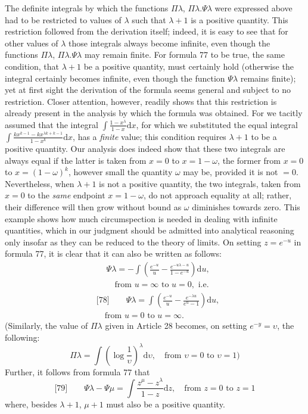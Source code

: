 The definite integrals by which the functions $\Pi\lambda$, $\Pi\lambda.\Psi\lambda$ were expressed above had to be restricted to values of $\lambda$ such that $\lambda+1$ is a positive quantity. This restriction followed from the derivation itself; indeed, it is easy to see that for other values of $\lambda$ those integrals always become infinite, even though the functions $\Pi\lambda$, $\Pi\lambda.\Psi\lambda$ may remain finite. For formula 77 to be true, the same condition, that $\lambda+1$ be a positive quantity, must certainly hold (otherwise the integral certainly becomes infinite, even though the function $\Psi\lambda$ remains finite); yet at first sight the derivation of the formula seems general and subject to no restriction. Closer attention, however, readily shows that this restriction is already present in the analysis by which the formula was obtained. For we tacitly assumed that the integral $\int\frac{1-x^\lambda}{1-x}\mathrm{d}x$, for which we substituted the equal integral $\int\frac{kx^{k-1}-kx^{\lambda k+k-1}}{1-x^k}\mathrm{d}x$, has a \emph{finite} value; this condition requires $\lambda+1$ to be a positive quantity. Our analysis does indeed show that these two integrals are always equal if the latter is taken from $x=0$ to $x=1-\omega$, the former from $x=0$ to $x=(1-\omega)^k$, however small the quantity $\omega$ may be, provided it is not $=0$. Nevertheless, when $\lambda+1$ is not a positive quantity, the two integrals, taken from $x=0$ to the \emph{same} endpoint $x=1-\omega$, do not approach equality at all; rather, their difference will then grow without bound as $\omega$ diminishes towards zero. This example shows how much circumspection is needed in dealing with infinite quantities, which in our judgment should be admitted into analytical reasoning only insofar as they can be reduced to the theory of limits.
On setting $z=e^{-u}$ in formula 77, it is clear that it can also be written as follows:
\[
\begin{aligned}
&\Psi\lambda=-\int\left(\frac{e^{-u}}{u}-\frac{e^{-u\lambda-u}}{1-e^{-u}}\right)\mathrm{d}u,
\\[4pt]
&\quad\text{from }u=\infty\text{ to }u=0,\text{ i.e.}
\end{aligned}
\]
\[
\begin{aligned}
&\text{[78]}\qquad
\Psi\lambda=\int\left(\frac{e^{-u}}{u}-\frac{e^{-\lambda u}}{e^u-1}\right)\mathrm{d}u,
\\[4pt]
&\quad\text{from }u=0\text{ to }u=\infty.
\end{aligned}
\]
(Similarly, the value of $\Pi\lambda$ given in Article 28 becomes, on setting $e^{-y}=\upsilon$, the following:
\[
\Pi\lambda=\int\left(\log\frac{1}{\upsilon}\right)^\lambda\mathrm{d}\upsilon,
\quad\text{from }\upsilon=0\text{ to }\upsilon=1)
\]
Further, it follows from formula 77 that
\[
\text{[79]}\qquad
\Psi\lambda-\Psi\mu=\int\frac{z^\mu-z^\lambda}{1-z}\mathrm{d}z,
\quad\text{from }z=0\text{ to }z=1
\]
where, besides $\lambda+1$, $\mu+1$ must also be a positive quantity.

